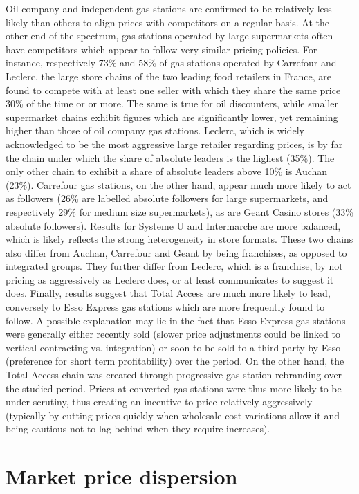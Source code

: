 \documentclass[english]{article}
\begin{document}
Oil company and independent gas stations are confirmed to be relatively less likely than others to align prices with competitors on a regular basis. At the other end of the spectrum, gas stations operated by large supermarkets often have competitors which appear to follow very similar pricing policies. For instance, respectively 73\% and 58\% of gas stations operated by Carrefour and Leclerc, the large store chains of the two leading food retailers in France, are found to compete with at least one seller with which they share the same price 30\% of the time or or more. The same is true for oil discounters, while smaller supermarket chains exhibit figures which are significantly lower, yet remaining higher than those of oil company gas stations.
Leclerc, which is widely acknowledged to be the most aggressive large retailer regarding prices, is by far the chain under which the share of absolute leaders is the highest (35\%). The only other chain to exhibit a share of absolute leaders above 10\% is Auchan (23\%). Carrefour gas stations, on the other hand, appear much more likely to act as followers (26\% are labelled absolute followers for large supermarkets, and respectively 29\% for medium size supermarkets), as are Geant Casino stores (33\% absolute followers). Results for Systeme U and Intermarche are more balanced, which is likely reflects the strong heterogeneity in store formats. These two chains also differ from Auchan, Carrefour and Geant by being franchises, as opposed to integrated groups. They further differ from Leclerc, which is a franchise, by not pricing as aggressively as Leclerc does, or at least communicates to suggest it does. Finally, results suggest that Total Access are much more likely to lead, conversely to Esso Express gas stations which are more frequently found to follow. A possible explanation may lie in the fact that Esso Express gas stations were generally either recently sold (slower price adjustments could be linked to vertical contracting vs. integration) or soon to be sold to a third party by Esso (preference for short term profitability) over the period. On the other hand, the Total Access chain was created through progressive gas station rebranding over the studied period. Prices at converted gas stations were thus more likely to be under scrutiny, thus creating an incentive to price relatively aggressively (typically by cutting prices quickly when wholesale cost variations allow it and being cautious not to lag behind when they require increases).

\section{Market price dispersion}
\end{document}
